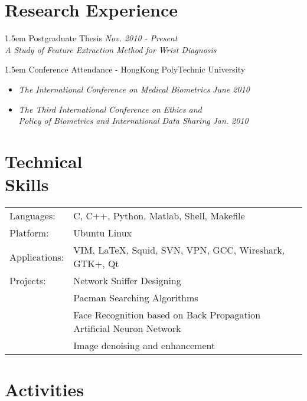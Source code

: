 \documentclass[margin]{res}
\newcommand\formatdata[1]{\textsl{\textsf{#1}}}
\begin{document}
\begin{resume}
\section{Research Experience}
\hangindent 1.5em
Postgraduate Thesis \hfill \formatdata{Nov. 2010 - Present} \\
\textsf{\emph{A Study of Feature Extraction Method for Wrist
Diagnosis}}
\vspace{-8pt}

\hangindent 1.5em
Conference Attendance - HongKong PolyTechnic University 
\begin{itemize} \itemsep -2pt
    \item \textsf{\textit{The International Conference on Medical
        Biometrics}} \hfill \formatdata{June 2010}
    \item \textsf{\emph{The Third International Conference on Ethics and \\
        Policy of Biometrics and International Data Sharing}}
\hfill \formatdata{Jan. 2010} 
\end{itemize}


\section{Technical \\ Skills}
\begin{tabular}{ll}
    \textsf{Languages:} & C, C++, Python, Matlab, Shell, Makefile\\
    \textsf{Platform:} & Ubuntu Linux \\
    \textsf{Applications:} & VIM, \LaTeX, Squid,
    SVN, VPN, GCC, Wireshark, GTK+, Qt\\
    \textsf{Projects:} & Network Sniffer Designing\\
    & Pacman Searching Algorithms \\
    & Face Recognition based on Back 
    Propagation Artificial Neuron Network \\
    & Image denoising and enhancement 
\end{tabular}

\section{Activities}


\end{resume}
\end{document}
